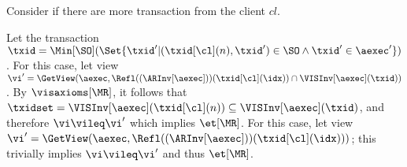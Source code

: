 \COMPLETELET{\MR}
Consider if there are more transaction from the client \( cl \).
\begin{enumerate}
    Let the transaction 
    \( \txid = \Min[\SO](\Set{ \txid' | (\txid[\cl](n), \txid') \in \SO \land \txid' \in \aexec' }) \).
    For this case, let view 
    \( \vi' = \GetView(\aexec, \Refl((\ARInv[\aexec]))(\txid[\cl](\idx)) \cap \VISInv[\aexec](\txid)) \).
    By \( \visaxioms[\MR] \), it follows that 
    \( \txidset = \VISInv[\aexec](\txid[\cl](n)) \subseteq \VISInv[\aexec](\txid) \),
    and therefore \( \vi \vileq \vi' \) which implies \( \et[\MR] \).
For this case, let view 
\( \vi' = \GetView(\aexec, \Refl((\ARInv[\aexec]))(\txid[\cl](\idx))) \);
this trivially implies \( \vi \vileq \vi' \) and thus \( \et[\MR] \). 
\end{enumerate}
